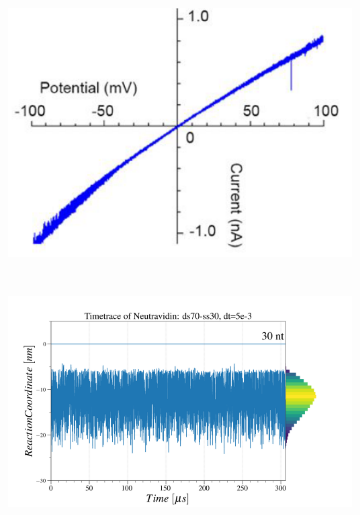 \begin{figure}[ht]
  \begin{centering}
  \begin{subfigure}[t]{\dimexpr.3\linewidth-1.3em\relax}
  \centering
  \vspace{0.2cm}
  \hbox{\hspace{0.4cm}
  \includegraphics[width=\linewidth,valign=t]{Figures/IV-70.png}}
  \end{subfigure}%
  \begin{subfigure}[t]{\dimexpr.5\linewidth-1.3em\relax}
  \centering
  \hbox{\hspace{0.1cm}
  \includegraphics[width=\linewidth,valign=t]{Figures/MR-70.png}}
  \end{subfigure}%
  \hspace{0.5cm}
  \begin{subfigure}[t]{\dimexpr.21\linewidth-1.3em\relax}

\end{subfigure}
\end{centering}
\end{figure}
